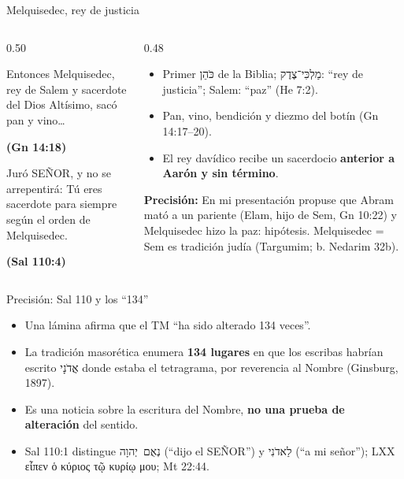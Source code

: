 \documentclass[hyperref={bookmarks=false},aspectratio=169]{beamer}
\newcommand{\heb}[1]{\mbox{\foreignlanguage{hebrew}{#1}}}
\newcommand{\grc}[1]{\foreignlanguage{ancientgreek}{#1}}
\newcommand{\SENOR}{S{\fontsize{0.78em}{1em}\selectfont EÑOR}}
\newcommand{\fuente}[1]{\par\hfill{\upshape\bfseries\footnotesize\textcolor{tierraroja}{#1}}}
\newcommand{\destacar}[1]{\textbf{\textcolor{tierraroja}{#1}}}
\newcommand{\precision}[1]{{\footnotesize\color{sepia}\textbf{Precisión:} #1}}
\begin{document}
\begin{frame}{Melquisedec, rey de justicia}
\begin{columns}[t,onlytextwidth]
\begin{column}{0.50\textwidth}
\begin{cita}[fontupper=\scriptsize\itshape]Entonces Melquisedec, rey de Salem y sacerdote del Dios Altísimo, sacó pan y vino\ldots\fuente{(Gn 14:18)}\end{cita}
\begin{cita}[fontupper=\scriptsize\itshape]Juró \SENOR, y no se arrepentirá: Tú eres sacerdote para siempre según el orden de Melquisedec.\fuente{(Sal 110:4)}\end{cita}
\end{column}
\begin{column}{0.48\textwidth}\scriptsize
\begin{itemize}
\item Primer \heb{כֹּהֵן} de la Biblia; \heb{מַלְכִּי־צֶדֶק}: ``rey de justicia''; Salem: ``paz'' (He 7:2).
\item Pan, vino, bendición y diezmo del botín (Gn 14:17--20).
\item El rey davídico recibe un sacerdocio \destacar{anterior a Aarón y sin término}.
\end{itemize}
\precision{En mi presentación propuse que Abram mató a un pariente (Elam, hijo de Sem, Gn 10:22) y Melquisedec hizo la paz: hipótesis. Melquisedec = Sem es tradición judía (Targumim; b. Nedarim 32b).}
\end{column}
\end{columns}
\end{frame}

\begin{frame}{Precisión: Sal 110 y los ``134''}
\small
\begin{itemize}
\item Una lámina afirma que el TM ``ha sido alterado 134 veces''.
\item La tradición masorética enumera \destacar{134 lugares} en que los escribas habrían escrito \heb{אֲדֹנָי} donde estaba el tetragrama, por reverencia al Nombre (Ginsburg, 1897).
\item Es una noticia sobre la escritura del Nombre, \destacar{no una prueba de alteración} del sentido.
\item Sal 110:1 distingue \heb{נְאֻם יְהוָה} (``dijo el \SENOR'') y \heb{לַאדֹנִי} (``a mi señor''); LXX \grc{εἶπεν ὁ κύριος τῷ κυρίῳ μου}; Mt 22:44.
\end{itemize}
\end{frame}
\end{document}
